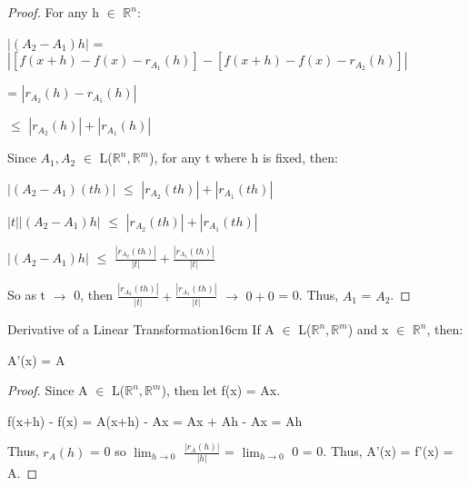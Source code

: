     \begin{proof}
        For any h $\in$ $\mathbb{R}^n$:
        
        \hspace{0.5cm}
        $|(A_2-A_1)h|$
        = $|[f(x+h)-f(x)-r_{A_1}(h)] - [f(x+h)-f(x)-r_{A_2}(h)]|$

        \hspace{2.9cm}
        = $|r_{A_2}(h) - r_{A_1}(h)|$

        \hspace{2.9cm}
        $\leq$ $|r_{A_2}(h)| + |r_{A_1}(h)|$

        Since $A_1,A_2$ $\in$ L($\mathbb{R}^n,\mathbb{R}^m$),
        for any t where h is fixed, then:

        \hspace{0.5cm}
        $|(A_2-A_1)(th)|$ $\leq$ $|r_{A_2}(th)| + |r_{A_1}(th)|$

        \hspace{0.5cm}
        $|t| |(A_2-A_1)h|$ $\leq$ $|r_{A_2}(th)| + |r_{A_1}(th)|$

        \hspace{0.5cm}
        $|(A_2-A_1)h|$ $\leq$ $\frac{|r_{A_2}(th)|}{|t|}
                                + \frac{|r_{A_1}(th)|}{|t|}$

        So as t $\rightarrow$ 0, then
        $\frac{|r_{A_2}(th)|}{|t|} + \frac{|r_{A_1}(th)|}{|t|}$ $\rightarrow$
        $0+0$ = 0. Thus, $A_1$ = $A_2$.
    \end{proof}

    \vspace{0.5cm}



    \begin{wtheorem}{Derivative of a Linear Transformation}{16cm}
        If A $\in$ L($\mathbb{R}^n,\mathbb{R}^m$) and x $\in$ $\mathbb{R}^n$, then:

        \hspace{0.5cm}
        A'(x) = A
    \end{wtheorem}

    \begin{proof}
        Since A $\in$ L($\mathbb{R}^n,\mathbb{R}^m$), then let f(x) = Ax.

        \hspace{0.5cm}
        f(x+h) - f(x)
        = A(x+h) - Ax
        = Ax + Ah - Ax
        = Ah

        Thus, $r_A(h)$  = 0
        so $\lim_{h \rightarrow 0}$ $\frac{|r_A(h)|}{|h|}$
        = $\lim_{h \rightarrow 0}$ 0 = 0. Thus, A'(x) = f'(x) = A.
    \end{proof}

